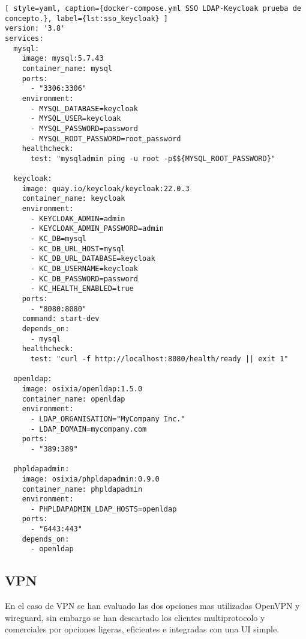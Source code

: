 \begin{lstlisting}[ style=yaml, caption={docker-compose.yml SSO LDAP-Keycloak prueba de concepto.}, label={lst:sso_keycloak} ]
version: '3.8'
services:      
  mysql:
    image: mysql:5.7.43
    container_name: mysql
    ports:
      - "3306:3306"
    environment:
      - MYSQL_DATABASE=keycloak
      - MYSQL_USER=keycloak
      - MYSQL_PASSWORD=password
      - MYSQL_ROOT_PASSWORD=root_password
    healthcheck:
      test: "mysqladmin ping -u root -p$${MYSQL_ROOT_PASSWORD}"

  keycloak:
    image: quay.io/keycloak/keycloak:22.0.3
    container_name: keycloak
    environment:
      - KEYCLOAK_ADMIN=admin
      - KEYCLOAK_ADMIN_PASSWORD=admin
      - KC_DB=mysql
      - KC_DB_URL_HOST=mysql
      - KC_DB_URL_DATABASE=keycloak
      - KC_DB_USERNAME=keycloak
      - KC_DB_PASSWORD=password
      - KC_HEALTH_ENABLED=true
    ports:
      - "8080:8080"
    command: start-dev
    depends_on:
      - mysql
    healthcheck:
      test: "curl -f http://localhost:8080/health/ready || exit 1"
     
  openldap:
    image: osixia/openldap:1.5.0
    container_name: openldap
    environment:
      - LDAP_ORGANISATION="MyCompany Inc."
      - LDAP_DOMAIN=mycompany.com
    ports:
      - "389:389"

  phpldapadmin:
    image: osixia/phpldapadmin:0.9.0
    container_name: phpldapadmin
    environment:
      - PHPLDAPADMIN_LDAP_HOSTS=openldap
    ports:
      - "6443:443"
    depends_on:
      - openldap
\end{lstlisting}

\subsection{VPN}
En el caso de VPN se han evaluado las dos opciones mas utilizadas OpenVPN y wireguard, sin embargo se han descartado  los clientes multiprotocolo y comerciales por opciones ligeras, eficientes e integradas con una UI simple.

